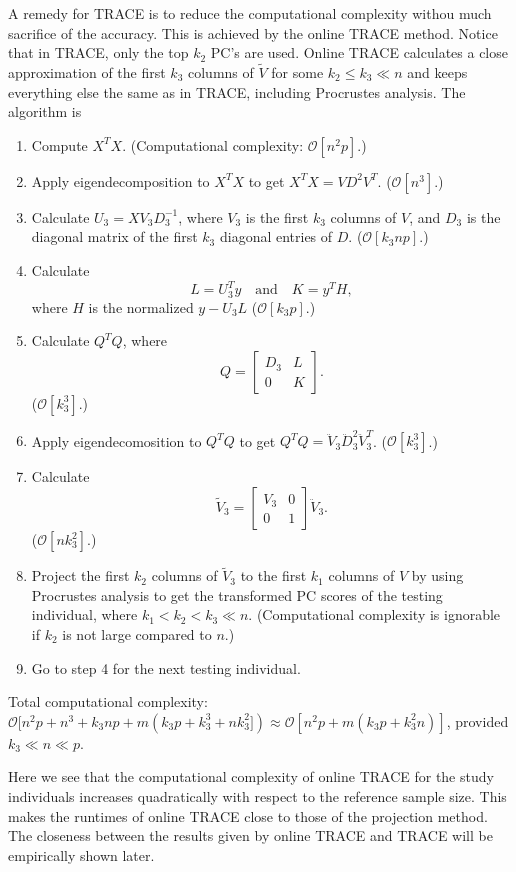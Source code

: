 \documentclass{article}[12pt]
\newcommand{\bO}{\mathcal{O}}
\begin{document}
A remedy for TRACE is to reduce the computational complexity withou much sacrifice of the accuracy.
This is achieved by the online TRACE method.
Notice that in TRACE, only the top $k_2$ PC's are used.
Online TRACE calculates a close approximation of the first $k_3$ columns of $\tilde{V}$ for some $k_2 \leq k_3 \ll n$ and keeps everything else the same as in TRACE, including Procrustes analysis. 
The algorithm is
\begin{enumerate}
\item Compute $X^T X$.
  (Computational complexity: $\bO[n^2p]$.)  
\item Apply eigendecomposition to $X^T X$ to get $X^T X = V D^2 V^T$.
  ($\bO[n^3]$.)
\item Calculate $U_3 = X V_3 D_3^{-1}$,
  where $V_3$ is the first $k_3$ columns of $V$,
  and $D_3$ is the diagonal matrix of the first $k_3$ diagonal entries of $D$.
  ($\bO[k_3 n p]$.)
\item Calculate 
  \[
    L = U_3^T y \quad \text{and} \quad K = y^T H,
  \]
  where $H$ is the normalized  $y - U_3L$
  ($\bO[k_3 p]$.)
\item Calculate $Q^T Q$, where
  \[
    Q = 
    \begin{bmatrix}
      D_3 & L \\
      0 & K
    \end{bmatrix}.
  \]
  ($\bO[k_3^3]$.)
\item Apply eigendecomosition to $Q^T Q$ to get $Q^T Q = \ddot{V}_3 \ddot{D}^2_3 \ddot{V}^T_3$.
  ($\bO[k_3^3]$.)
\item Calculate
  \[
    \tilde{V}_3 =
    \begin{bmatrix}
      V_3 & 0 \\
      0 & 1
    \end{bmatrix}
    \ddot{V}_3.
  \]
  ($\bO[nk_3^2]$.)
\item Project the first $k_2$ columns of $\tilde{V}_3$ to the first $k_1$ columns of $V$ by using Procrustes analysis to get the transformed PC scores of the testing individual,
  where $k_1 < k_2  < k_3 \ll n$.
  (Computational complexity is ignorable if $k_2$ is not large compared to $n$.)
  \item Go to step 4 for the next testing individual.
\end{enumerate}

Total computational complexity: $\bO[n^2p + n^3 + k_3np + m(k_3p + k_3^3 + nk_3^2]) \approx \bO[n^2p + m(k_3p + k_3^2n)]$, provided $k_3 \ll n \ll p$.

Here we see that the computational complexity of online TRACE for the study individuals increases quadratically with respect to the reference sample size.
This makes the runtimes of online TRACE close to those of the projection method.
The closeness between the results given by online TRACE and TRACE will be empirically shown later.
\end{document}
